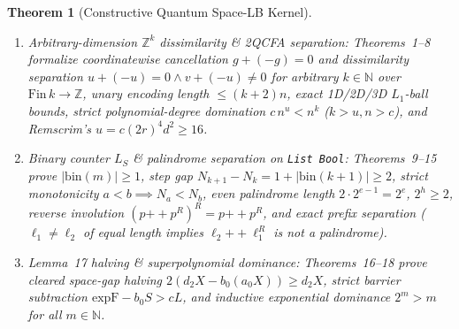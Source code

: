 \documentclass[11pt,twocolumn]{article}
\newtheorem{theorem}{Theorem}
\newcommand{\ZZ}{\mathbb{Z}}
\newcommand{\NN}{\mathbb{N}}
\begin{document}
\begin{theorem}[Constructive Quantum Space-LB Kernel]\label{thm:lean}
\leavevmode
\begin{enumerate}[leftmargin=*,nosep]
  \item \emph{Arbitrary-dimension $\ZZ^k$ dissimilarity \& 2QCFA separation:} Theorems~1--8 formalize coordinatewise cancellation $g + (-g) = 0$ and dissimilarity separation $u + (-u) = 0 \land v + (-u) \neq 0$ for arbitrary $k \in \NN$ over $\mathrm{Fin}\,k \to \ZZ$, unary encoding length $\le (k+2)n$, exact 1D/2D/3D $L_1$-ball bounds, strict polynomial-degree domination $c\,n^u < n^k$ ($k > u, n > c$), and Remscrim's $u = c(2r)^4 d^2 \ge 16$.
  \item \emph{Binary counter $L_S$ \& palindrome separation on \texttt{List Bool}:} Theorems~9--15 prove $|\mathrm{bin}(m)| \ge 1$, step gap $N_{k+1} - N_k = 1 + |\mathrm{bin}(k+1)| \ge 2$, strict monotonicity $a < b \implies N_a < N_b$, even palindrome length $2\cdot 2^{e-1} = 2^e$, $2^h \ge 2$, reverse involution $(p \mathbin{+\!\!+} p^R)^R = p \mathbin{+\!\!+} p^R$, and exact prefix separation ($\ell_1 \neq \ell_2$ of equal length implies $\ell_2 \mathbin{+\!\!+} \ell_1^R$ is not a palindrome).
  \item \emph{Lemma~17 halving \& superpolynomial dominance:} Theorems~16--18 prove cleared space-gap halving $2(d_2 X - b_0(a_0 X)) \ge d_2 X$, strict barrier subtraction $\mathrm{expF} - b_0 S > c L$, and inductive exponential dominance $2^m > m$ for all $m \in \NN$.
\end{enumerate}
\end{theorem}
\end{document}

